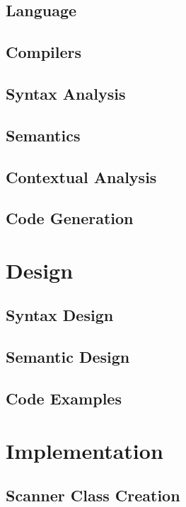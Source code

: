 	\section{Language}
	\section{Compilers}
	
	\section{Syntax Analysis}
	\section{Semantics}
	\section{Contextual Analysis}
	\section{Code Generation}

\renewcommand{\ind}[1]{}
\chapter{Design}
	\section{Syntax Design}
	\ind{grammarchoice}
	\ind{BNF5}
	\ind{TokenSpecification}
	\section{Semantic Design}
	\ind{semantics}
	\ind{TypeRules}
	\section{Code Examples}

\renewcommand{\ind}[1]{}
\chapter{Implementation}
	\ind{KnownLexersAndParsers}
	\section{Scanner Class Creation}
